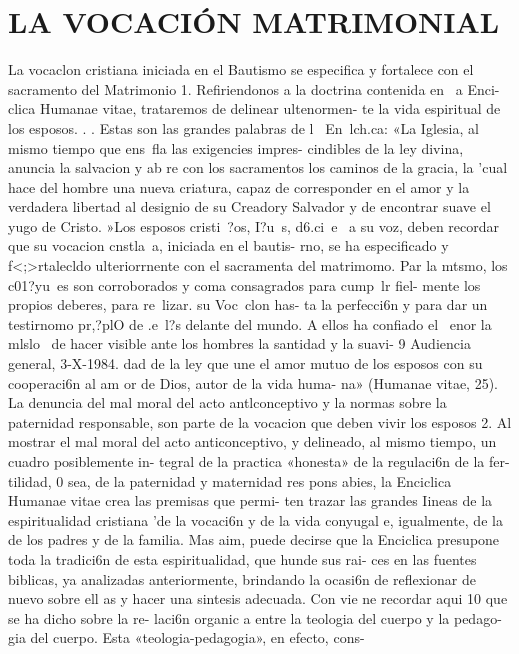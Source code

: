 \documentclass[letterpaper]{report}
\begin{document}
	{\centering
		\section{LA VOCACI\'ON MATRIMONIAL}
	}
	La vocaclon cristiana iniciada en el Bautismo se 
especifica y fortalece con el sacramento del Matrimonio 
1. Refiriendonos a la doctrina contenida en ~a Enci- 
clica Humanae vitae, trataremos de delinear ultenormen- 
	te la vida espiritual de los esposos. 	. . 
Estas son las grandes palabras de l~ En~lch.ca: «La 
Iglesia, al mismo tiempo que ens~fla las exigencies impres- 
cindibles de la ley divina, anuncia la salvacion y ab re con 
los sacramentos los caminos de la gracia, la 'cual hace del 
hombre una nueva criatura, capaz de corresponder en el 
amor y la verdadera libertad al designio de su Creadory 
Salvador y de encontrar suave el yugo de Cristo. 
»Los esposos cristi~?os, I?u~s, d6.ci~e~ a su voz, deben 
recordar que su vocacion cnstla~a, iniciada en el bautis- 
rno, se ha especificado y f<;>rtalecldo ulteriorrnente con el 
sacramenta del matrimomo. Par la mtsmo, los c01?yu~es 
son corroborados y coma consagrados para cump~lr fiel- 
mente los propios deberes, para re~lizar. su Voc~clon has- 
ta la perfecci6n y para dar un testirnomo pr,?plO de .e~l?s 
delante del mundo. A ellos ha confiado el ~enor la mlslo~ 
de hacer visible ante los hombres la santidad y la suavi- 
9 Audiencia general, 3-X-1984.
dad de la ley que une el amor mutuo de los esposos con 
su cooperaci6n al am or de Dios, autor de la vida huma- 
na» (Humanae vitae, 25). 
La denuncia del mal moral del acto antlconceptivo 
y la normas sobre la paternidad responsable, 
son parte de la vocacion que deben vivir los esposos 
2. Al mostrar el mal moral del acto anticonceptivo, y 
delineado, al mismo tiempo, un cuadro posiblemente in- 
tegral de la practica «honesta» de la regulaci6n de la fer- 
tilidad, 0 sea, de la paternidad y maternidad res pons abies, 
la Enciclica Humanae vitae crea las premisas que permi- 
ten trazar las grandes Iineas de la espiritualidad cristiana 
'de la vocaci6n y de la vida conyugal e, igualmente, de la 
de los padres y de la familia. 
Mas aim, puede decirse que la Enciclica presupone 
toda la tradici6n de esta espiritualidad, que hunde sus rai- 
ces en las fuentes biblicas, ya analizadas anteriormente, 
brindando la ocasi6n de reflexionar de nuevo sobre ell as 
y hacer una sintesis adecuada. 
Con vie ne recordar aqui 10 que se ha dicho sobre la re- 
laci6n organic a entre la teologia del cuerpo y la pedago- 
gia del cuerpo. Esta «teologia-pedagogia», en efecto, cons- 
\end{document}
